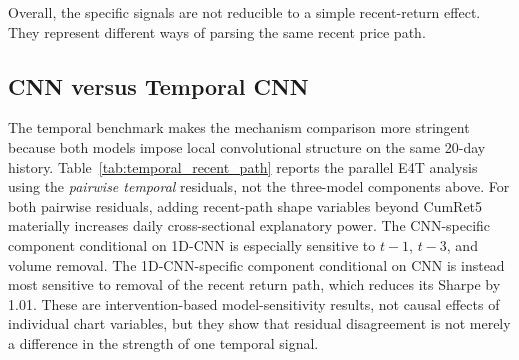 

Overall, the specific signals are not reducible to a simple recent-return effect. They represent different ways of parsing the same recent price path.

\subsection{CNN versus Temporal CNN}

The temporal benchmark makes the mechanism comparison more stringent because both models impose local convolutional structure on the same 20-day history. Table~\ref{tab:temporal_recent_path} reports the parallel E4T analysis using the \emph{pairwise temporal} residuals, not the three-model components above. For both pairwise residuals, adding recent-path shape variables beyond CumRet5 materially increases daily cross-sectional explanatory power. The CNN-specific component conditional on 1D-CNN is especially sensitive to $t-1$, $t-3$, and volume removal. The 1D-CNN-specific component conditional on CNN is instead most sensitive to removal of the recent return path, which reduces its Sharpe by 1.01. These are intervention-based model-sensitivity results, not causal effects of individual chart variables, but they show that residual disagreement is not merely a difference in the strength of one temporal signal.



